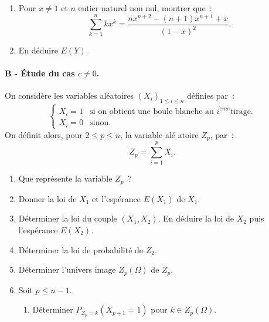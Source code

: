 \begin{exercice}
\begin{enumerate}
\item Pour $x\neq 1$ et $n$ entier naturel non nul, montrer que~: 
\begin{equation*}
\sum_{k=1}^{n}kx^{k}=\frac{nx^{n+2}-(n+1)x^{n+1}+x}{(1-x)^{2}}.
\end{equation*}

\item En d\'{e}duire $E(Y)$.
\end{enumerate}

\paragraph{\small{B - \'Etude du cas $c\neq 0$.}\\}

On consid\`{e}re les variables al\'{e}atoires $\left( X_{i}\right)
_{1\leqslant i\leqslant n}$ d\'{e}finies par~: 
\begin{equation*}
\begin{cases}
X_{i}=1 & \text{si on obtient une boule blanche au }i^{\grave{e}me}\text{
tirage.} \\ 
X_{i}=0 & \text{sinon.}%
\end{cases}%
\end{equation*}%
On d\'{e}finit alors, pour $2\leqslant p\leqslant n$, la variable al\'{e}%
atoire $Z_{p}$, par~: 
\begin{equation*}
Z_{p}=\sum_{i=1}^{p}X_{i}.
\end{equation*}

\begin{enumerate}
\item Que repr\'{e}sente la variable $Z_{p}$~?

\item Donner la loi de $X_{1}$ et l'esp\'{e}rance $E(X_{1})$ de $X_{1}$.

\item D\'{e}terminer la loi du couple $(X_{1},X_{2})$. En d\'{e}duire la loi
de $X_{2}$ puis l'esp\'{e}rance $E(X_{2})$.

\item D\'{e}terminer la loi de probabilit\'{e} de $Z_{2}$.

\item D\'{e}terminer l'univers image $Z_{p}\left( \Omega \right) $ de $Z_{p} 
$.

\item Soit $p\leqslant n-1$.

\begin{enumerate}
\item D\'{e}terminer $P_{Z_{p}=k}(X_{p+1}=1)$ pour $k\in Z_{p}\left( \Omega
\right) $.


\end{enumerate}
\end{enumerate}
\end{exercice}
